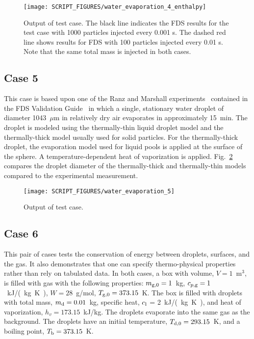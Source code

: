 \documentclass[11pt]{book}
\begin{document}
\begin{figure}[h!]
\centering
\texttt{[image: SCRIPT\_FIGURES/water\_evaporation\_4\_enthalpy]}
\caption[Sample case ]{Output of  test case.  The black line indicates the FDS results for the test case with 1000 particles injected every 0.001 s.  The dashed red line shows results for FDS with 100 particles injected every 0.01 s.  Note that the same total mass is injected in both cases.}
\label{water_evaporation_4_plot}
\end{figure}

\FloatBarrier

\subsection{Case 5}
\label{water_evaporation_5}

This case is based upon one of the Ranz and Marshall experiments~\cite{Ranz} contained in the FDS Validation Guide~\cite{FDS_Validation_Guide} in which a single, stationary water droplet of diameter 1043~$\mu$m in relatively dry air evaporates in approximately 15~min. The droplet is modeled using the thermally-thin liquid droplet model and the thermally-thick model usually used for solid particles. For the thermally-thick droplet, the evaporation model used for liquid pools is applied at the surface of the sphere. A temperature-dependent heat of vaporization is applied. Fig.~\ref{water_evaporation_5_plot} compares the droplet diameter of the thermally-thick and thermally-thin models compared to the experimental measurement.

\begin{figure}[h!]
\centering
\texttt{[image: SCRIPT\_FIGURES/water\_evaporation\_5]}
\caption[Sample case ]{Output of  test case.}
\label{water_evaporation_5_plot}
\end{figure}

\FloatBarrier

\subsection{Case 6}
\label{water_evaporation_6}

This pair of cases tests the conservation of energy between droplets, surfaces, and the gas. It also demonstrates that one can specify thermo-physical properties rather than rely on tabulated data. In both cases, a box with volume, $V=1$~m$^3$, is filled with gas with the following properties: $m_{\rm g,0}=1$~kg, $c_{p,\rm g}=1$~\si{kJ/(kg.K)}, $W=28$~g/mol, $T_{{\rm g},0}=373.15$~K.  The box is filled with droplets with total mass, $m_{\rm d}=0.01$~kg, specific heat, $c_{\rm l}$ = 2~\si{kJ/(kg.K)}, and heat of vaporization, $h_v=173.15$~kJ/kg. The droplets evaporate into the same gas as the background.  The droplets have an initial temperature, $T_{\rm d,0}=293.15$~K, and a boiling point, $T_{\rm b}=373.15$~K.
\end{document}
